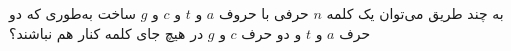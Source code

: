 \EXERCISE
به چند طریق می‌توان یک کلمه
$n$
حرفی با حروف
$a$
و
$t$
و
$c$
و
$g$
ساخت به‌طوری که دو حرف
$a$
و
$t$
و دو حرف
$c$
و
$g$
در هیچ جای کلمه کنار هم نباشند؟